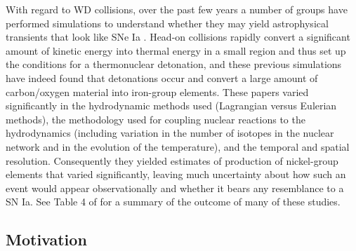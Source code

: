 \documentclass[12pt]{article}
\begin{document}
With regard to WD collisions, over the past few years a number of groups have performed simulations
to understand whether they may yield astrophysical transients that look like SNe Ia
\citep{rosswog:2009,raskin:2010,loren-aguilar:2010,hawley:2012,garcia-senz:2013,
kushnir:2013,papish:2015,holcomb:2015}. Head-on collisions rapidly convert a significant
amount of kinetic energy into thermal energy in a small region and thus set up the
conditions for a thermonuclear detonation, and these previous simulations have indeed
found that detonations occur and convert a large amount of carbon/oxygen material into
iron-group elements. These papers varied significantly in the hydrodynamic methods used
(Lagrangian versus Eulerian methods), the methodology used for coupling nuclear
reactions to the hydrodynamics (including variation in the number of isotopes in
the nuclear network and in the evolution of the temperature), and the temporal and
spatial resolution. Consequently they yielded estimates of production of nickel-group
elements that varied significantly, leaving much uncertainty about how such an event
would appear observationally and whether it bears any resemblance to a SN Ia.
See Table 4 of \cite{garcia-senz:2013} for a summary of the outcome of many of these studies.

\subsection{Motivation}
\label{sec:motivation}
\end{document}
